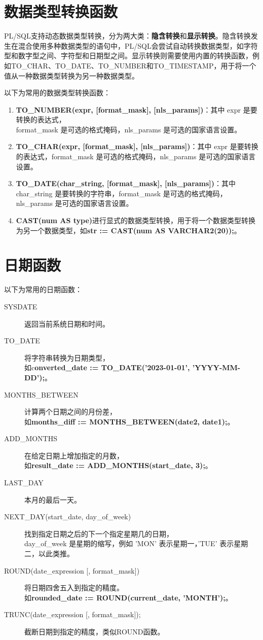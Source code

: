 \documentclass[11pt, a4paper, oneside, UTF8]{ctexbook}
\let\kaishu\relax %
\begin{document}
\section{数据类型转换函数}

PL/SQL支持动态数据类型转换，分为两大类：{\bfseries\kaishu 隐含转换}和{\bfseries\kaishu 显示转换}。隐含转换发生在混合使用多种数据类型的语句中，PL/SQL会尝试自动转换数据类型，如字符型和数字型之间、字符型和日期型之间。显示转换则需要使用内置的转换函数，例如TO\_CHAR、TO\_DATE、TO\_NUMBER和TO\_TIMESTAMP，用于将一个值从一种数据类型转换为另一种数据类型。

以下为常用的数据类型转换函数：
\begin{enumerate}
  \item {\bfseries\kaishu TO\_NUMBER(expr, [format\_mask], [nls\_params])}：其中 expr 是要转换的表达式，\\format\_mask 是可选的格式掩码，nls\_params 是可选的国家语言设置。
  \item {\bfseries\kaishu TO\_CHAR(expr, [format\_mask], [nls\_params])}：其中 expr 是要转换的表达式，format\_mask 是可选的格式掩码，nls\_params 是可选的国家语言设置。
  \item {\bfseries\kaishu TO\_DATE(char\_string, [format\_mask], [nls\_params])}：其中 char\_string 是要转换的字符串，format\_mask 是可选的格式掩码，nls\_params 是可选的国家语言设置。
  \item {\bfseries\kaishu CAST(num AS type)}进行显式的数据类型转换，用于将一个数据类型转换为另一个数据类型，如\textbf{str := CAST(num AS VARCHAR2(20));}。
\end{enumerate}

\section{日期函数}
以下为常用的日期函数：
\begin{description}
  \item[SYSDATE] 返回当前系统日期和时间。
  \item[TO\_DATE] 将字符串转换为日期类型，\\如c{\bfseries\kaishu onverted\_date := TO\_DATE('2023-01-01', 'YYYY-MM-DD');}。
  \item[MONTHS\_BETWEEN] 计算两个日期之间的月份差，\\如\textbf{months\_diff := MONTHS\_BETWEEN(date2, date1);}。
  \item[ADD\_MONTHS] 在给定日期上增加指定的月数，\\如\textbf{result\_date := ADD\_MONTHS(start\_date, 3);}。
  \item[LAST\_DAY] 本月的最后一天。
  \item[NEXT\_DAY(start\_date, day\_of\_week)] 找到指定日期之后的下一个指定星期几的日期，\\day\_of\_week 是星期的缩写，例如 'MON' 表示星期一，'TUE' 表示星期二，以此类推。
  \item[\textup{ROUND(date\_expression [, format\_mask])}] 将日期四舍五入到指定的精度。\\如\textbf{rounded\_date := ROUND(current\_date, 'MONTH');}。
  \item[\textup{TRUNC(date\_expression [, format\_mask]);}] 截断日期到指定的精度，类似ROUND函数。
\end{description}
\end{document}
